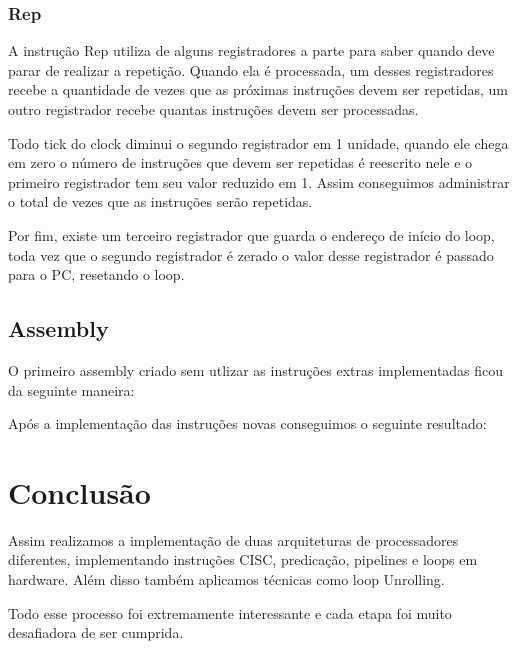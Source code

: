 \documentclass{article}
\begin{document}
    \subsubsection{Rep}

    A instrução Rep utiliza de alguns registradores a parte para saber quando deve parar de realizar a repetição. Quando ela é processada, um desses registradores recebe a quantidade de vezes que as próximas instruções devem ser repetidas, um outro registrador recebe quantas instruções devem ser processadas.

    Todo tick do clock diminui o segundo registrador em 1 unidade, quando ele chega em zero o número de instruções que devem ser repetidas é reescrito nele e o primeiro registrador tem seu valor reduzido em 1.
    Assim conseguimos administrar o total de vezes que as instruções serão repetidas.
    
    Por fim, existe um terceiro registrador que guarda o endereço de início do loop, toda vez que o segundo registrador é zerado o valor desse registrador é passado para o PC, resetando o loop.

    \subsection{Assembly}

    O primeiro assembly criado sem utlizar as instruções extras implementadas ficou da seguinte maneira:


    Após a implementação das instruções novas conseguimos o seguinte resultado:



    \section{Conclusão}

    Assim realizamos a implementação de duas arquiteturas de processadores diferentes, implementando instruções CISC, predicação, pipelines e loops em hardware. Além disso também aplicamos técnicas como loop Unrolling.
    
    Todo esse processo foi extremamente interessante e cada etapa foi muito desafiadora de ser cumprida.
\end{document}
